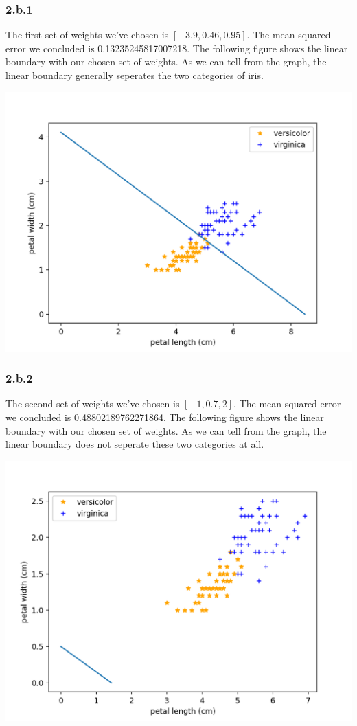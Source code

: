 \documentclass[12pt]{article}
\begin{document}
\subsubsection*{2.b.1}
The first set of weights we've chosen is $[-3.9, 0.46, 0.95]$. The mean squared error we concluded is 0.13235245817007218. The following figure shows the linear boundary with our chosen set of weights. As we can tell from the graph, the
linear boundary generally seperates the two categories of iris. 
\begin{center}
    \includegraphics[scale=0.6]{fig/p2_b1.png}
\end{center}

\subsubsection*{2.b.2}
The second set of weights we've chosen is $[-1, 0.7, 2]$. The mean squared error we concluded is 0.48802189762271864. The following figure shows the linear boundary with our chosen set of weights. As we can tell from the graph, the linear boundary does not seperate these two categories 
at all. 
\begin{center}
    \includegraphics[scale=0.6]{fig/p2_b2.png}
\end{center}
\end{document}
